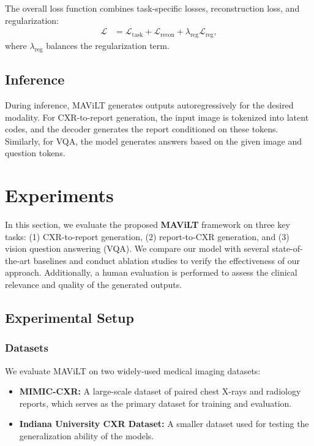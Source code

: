 The overall loss function combines task-specific losses, reconstruction loss, and regularization:
\begin{align}
    \mathcal{L} &= \mathcal{L}_{\text{task}} + \mathcal{L}_{\text{recon}} + \lambda_{\text{reg}} \mathcal{L}_{\text{reg}},
\end{align}
where \( \lambda_{\text{reg}} \) balances the regularization term.

\subsection{Inference}

During inference, MAViLT generates outputs autoregressively for the desired modality. For CXR-to-report generation, the input image is tokenized into latent codes, and the decoder generates the report conditioned on these tokens. Similarly, for VQA, the model generates answers based on the given image and question tokens.



\section{Experiments}

In this section, we evaluate the proposed \textbf{MAViLT} framework on three key tasks: (1) CXR-to-report generation, (2) report-to-CXR generation, and (3) vision question answering (VQA). We compare our model with several state-of-the-art baselines and conduct ablation studies to verify the effectiveness of our approach. Additionally, a human evaluation is performed to assess the clinical relevance and quality of the generated outputs.

\subsection{Experimental Setup}

\subsubsection{Datasets}
We evaluate MAViLT on two widely-used medical imaging datasets:
\begin{itemize}
    \item \textbf{MIMIC-CXR:} A large-scale dataset of paired chest X-rays and radiology reports, which serves as the primary dataset for training and evaluation.
    \item \textbf{Indiana University CXR Dataset:} A smaller dataset used for testing the generalization ability of the models.
\end{itemize}

